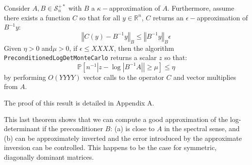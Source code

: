 \begin{theorem}\label{thm:preconditioning-approx}Consider $A,B\in\mathcal{S}_{n}^{+*}$
with $B$ a $\kappa-$approximation of $A$. Furthermore, assume there
exists a function $C$ so that for all $y\in\mathbb{R}^{n}$, $C$
returns an $\epsilon-$approximation of $B^{-1}y$:
\[
\left\Vert C\left(y\right)-B^{-1}y\right\Vert _{B}\leq\left\Vert B^{-1}y\right\Vert _{B}\epsilon
\]
Given $\eta>0$ and$\mu>0$, if $\epsilon\leq XXXX$, then the algorithm
\texttt{PreconditionedLogDetMonteCarlo} returns a scalar $z$ so that:
\[
\mathbb{P}\left[n^{-1}\left|z-\log\left|B^{-1}A\right|\right|\geq\mu\right]\leq\eta
\]
by performing $O\left(YYYY\right)$ vector calls to the operator $C$
and vector multiplies from $A$. 

\end{theorem}

The proof of this result is detailed in Appendix A.

This last theorem shows that we can compute a good approximation of
the log-determinant if the preconditioner $B$: (a) is close to $A$
in the spectral sense, and (b) can be approximately inverted and the
error introduced by the approximate inversion can be controlled. This
happens to be the case for symmetric, diagonally dominant matrices.
